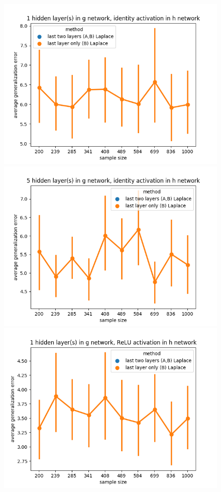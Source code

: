 \documentclass[11pt]{article}
\numberwithin{equation}{section}
\theoremstyle{plain}
\theoremstyle{definition}
\begin{document}
\begin{figure}[t!]
	\begin{center}
		\includegraphics[scale=0.45]{laplace_taskid0.png}
		\includegraphics[scale=0.45]{laplace_taskid1.png}
		\includegraphics[scale=0.45]{laplace_taskid2.png}

\end{center}
\end{figure}
\end{document}
